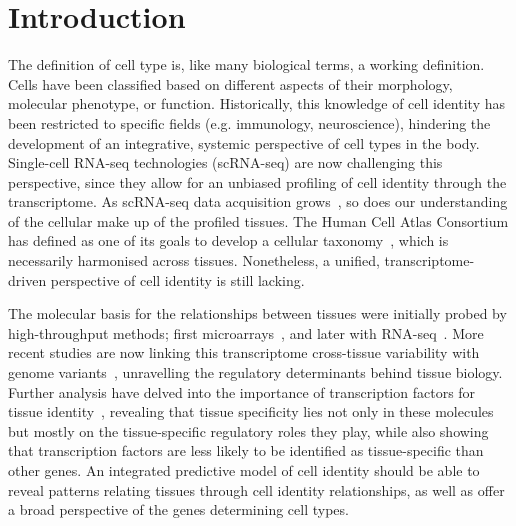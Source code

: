 \section{Introduction}
\label{section4.1}
The definition of cell type is, like many biological terms, a working definition. Cells have been classified based on different aspects of their morphology, molecular phenotype, or function. Historically, this knowledge of cell identity has been restricted to specific fields (e.g. immunology, neuroscience), hindering the development  of an integrative, systemic perspective of cell types in the body. Single-cell RNA-seq technologies (scRNA-seq) are now challenging this perspective, since they allow for an unbiased profiling of cell identity through the transcriptome. As scRNA-seq data acquisition grows~\citep{svensson_exponential_2018}, so does our understanding of the cellular make up of the profiled tissues. The Human Cell Atlas Consortium has defined as one of its goals to develop a cellular taxonomy~\citep{regev_human_2017}, which is necessarily harmonised across tissues. Nonetheless, a unified, transcriptome-driven perspective of cell identity is still lacking.

The molecular basis for the relationships between tissues were initially probed by high-throughput methods; first microarrays~\citep{enard_intra-_2002}, and later with RNA-seq~\citep{mortazavi_mapping_2008,brawand_evolution_2011,barbosa-morais_evolutionary_2012}. More recent studies are now linking this transcriptome cross-tissue  variability with genome variants~\citep{consortium_genotype-tissue_2015,gtex_consortium_genetic_2017}, unravelling the regulatory determinants behind tissue biology. Further analysis have delved into the importance of transcription factors for tissue identity~\citep{sonawane_understanding_2017}, revealing that tissue specificity lies not only in these molecules but mostly on the tissue-specific regulatory roles they play, while also showing that transcription factors are less likely to be identified as tissue-specific than other genes. An integrated predictive model of cell identity should be able to reveal patterns relating tissues through cell identity relationships, as well as offer a broad perspective of the genes determining cell types.

